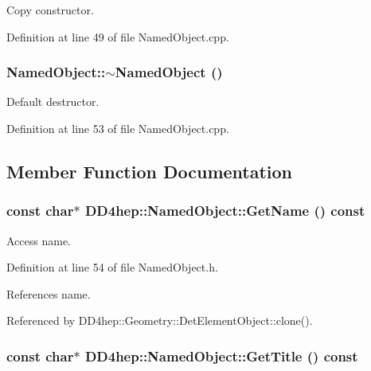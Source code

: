 Copy constructor. 

Definition at line 49 of file NamedObject.cpp.\hypertarget{class_d_d4hep_1_1_named_object_ad13ddb19830d49ca540eb1491c40de03}{
\subsubsection[{$\sim$NamedObject}]{\setlength{\rightskip}{0pt plus 5cm}NamedObject::$\sim$NamedObject ()}}
\label{class_d_d4hep_1_1_named_object_ad13ddb19830d49ca540eb1491c40de03}


Default destructor. 

Definition at line 53 of file NamedObject.cpp.

\subsection{Member Function Documentation}
\hypertarget{class_d_d4hep_1_1_named_object_a41b5b07d0f87421de998bf7cb92065c6}{
\subsubsection[{GetName}]{\setlength{\rightskip}{0pt plus 5cm}const char$\ast$ DD4hep::NamedObject::GetName () const}}
\label{class_d_d4hep_1_1_named_object_a41b5b07d0f87421de998bf7cb92065c6}


Access name. 

Definition at line 54 of file NamedObject.h.

References name.

Referenced by DD4hep::Geometry::DetElementObject::clone().\hypertarget{class_d_d4hep_1_1_named_object_a2f56103ba5eb88e8d1231b5db5494468}{
\subsubsection[{GetTitle}]{\setlength{\rightskip}{0pt plus 5cm}const char$\ast$ DD4hep::NamedObject::GetTitle () const}}
\label{class_d_d4hep_1_1_named_object_a2f56103ba5eb88e8d1231b5db5494468}


